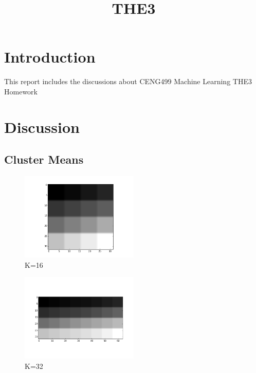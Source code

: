 \documentclass[conference]{IEEEtran}
\begin{document}
    \title{THE3\\
    }

    \author{
    }

    \maketitle


    \section{Introduction}
    This report includes the discussions about CENG499 Machine Learning THE3 Homework \\

    \section{Discussion}

    \subsection{Cluster Means}

    \begin{figure}[htbp]
        \centerline{\includegraphics[width=0.5\textwidth]{16.png}}
        \caption{K=16}
        \label{k16}
    \end{figure}

    \begin{figure}[htbp]
        \centerline{\includegraphics[width=0.5\textwidth]{32.png}}
        \caption{K=32}
        \label{k32}
    \end{figure}
\end{document}
